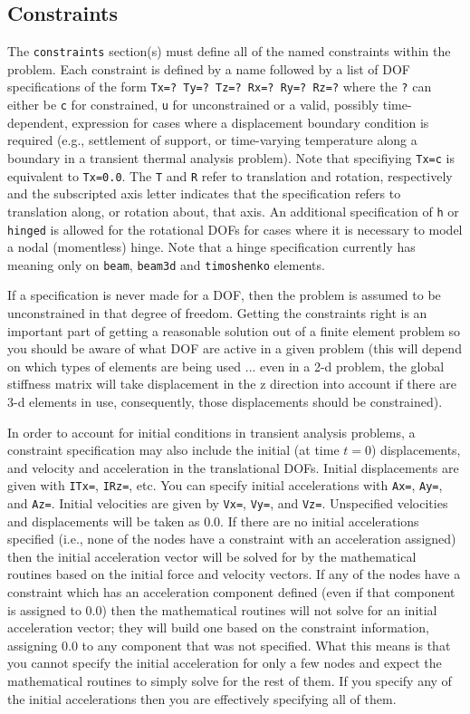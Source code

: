 \subsection{Constraints}

The {\tt constraints} section(s) must define all of the named constraints 
within the problem.  Each constraint is defined by a name followed by a list 
of DOF specifications of the form {\tt Tx=? Ty=? Tz=? Rx=? Ry=? Rz=?} 
where the {\tt ?}  
can either be {\tt c} for constrained, {\tt u} for unconstrained or a 
valid, possibly time-dependent, expression for cases where a displacement 
boundary condition is required (e.g., settlement of support, or time-varying
temperature along a boundary in a transient thermal analysis problem).  Note 
that specifiying {\tt Tx=c} is equivalent to {\tt Tx=0.0}.  The {\tt T} and 
{\tt R} refer to 
translation and rotation, respectively and the subscripted axis letter 
indicates that the specification refers to translation along, or rotation 
about, that axis.  An additional specification of {\tt h} or {\tt hinged}
is allowed for the rotational DOFs for cases where it is necessary to model
a nodal (momentless) hinge.  Note that a hinge specification currently
has meaning only on {\tt beam}, {\tt beam3d} and {\tt timoshenko} elements.  

If a specification is never made for a DOF, then
the problem is assumed to be unconstrained in that degree of freedom.
Getting the constraints right is an important part 
of getting a reasonable solution out of a finite element problem so you
should be aware of what DOF are active in a given problem (this will 
depend on which types of elements are being used ... even in a 2-d problem, 
the global stiffness matrix will take displacement in the z direction into 
account if there are 3-d elements in use, consequently, those displacements 
should be constrained).	

In order to account for initial conditions in transient analysis
problems, a constraint specification may also include the initial (at time
$t=0$) displacements, and velocity
and acceleration in the translational DOFs.  Initial displacements are given
with {\tt ITx=}, {\tt IRz=}, etc.  You can specify initial accelerations with
{\tt Ax=}, {\tt Ay=}, and {\tt Az=}. Initial velocities are given by {\tt Vx=},
{\tt Vy=}, and {\tt Vz=}.  Unspecified velocities and displacements will be 
taken as 0.0.  If there are no initial accelerations specified (i.e., none of 
the nodes have a constraint with an acceleration assigned) then the initial 
acceleration vector will be solved for by the mathematical routines based on 
the initial force and velocity vectors.  If any of the
nodes have a constraint which has an acceleration component defined (even
if that component is assigned to 0.0) then the mathematical routines will
not solve for an initial acceleration vector; they will build one based
on the constraint information, assigning 0.0 to any component that was
not specified.  What this means is that you cannot specify the initial
acceleration for only a few nodes and expect the mathematical routines
to simply solve for the rest of them. If you specify any of the initial
accelerations then you are effectively specifying all of them.

